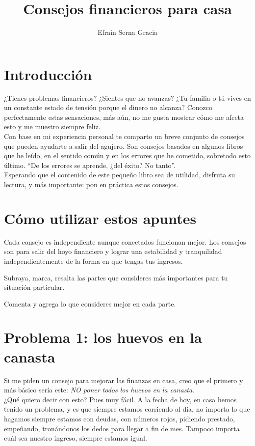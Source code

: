 \documentclass[12pt]{book} %
\title{Consejos financieros para casa}
\author{Efraín Serna Gracia}
\begin{document}
\maketitle
\tableofcontents
\chapter{Introducción}
¿Tienes problemas financieros? ¿Sientes que no avanzas? ¿Tu familia o tú vives en un constante estado de tensión porque el dinero no alcanza? Conozco perfectamente estas sensaciones, más aún, no me gusta mostrar cómo me afecta esto y me muestro siempre feliz.\\

Con base en mi experiencia personal te comparto un breve conjunto de consejos que pueden ayudarte a salir del agujero. Son consejos basados en algunos libros que he leído, en el sentido común y en los errores que he cometido, sobretodo esto último. ``De los errores se aprende, ¿del éxito? No tanto''.\\

Esperando que el contenido de este pequeño libro sea de utilidad, disfruta su lectura, y más importante: pon en práctica estos consejos.

\chapter{Cómo utilizar estos apuntes}
Cada consejo es independiente aunque conectados funcionan mejor. Los consejos son para salir del hoyo financiero y lograr una estabilidad y tranquilidad independientemente de la forma en que tengas tus ingresos.

Subraya, marca, resalta las partes que consideres más importantes para tu situación particular.

Comenta y agrega lo que consideres mejor en cada parte.

\chapter[Los huevos en la canasta]{Problema 1: los huevos en la canasta}
Si me piden un consejo para mejorar las finanzas en casa, creo que el primero y más básico sería este: \emph{NO poner todos los huevos en la canasta}.\\

¿Qué quiero decir con esto? Pues muy fácil. A la fecha de hoy, en casa hemos tenido un problema, y es que siempre estamos corriendo al día, no importa lo que hagamos siempre estamos con deudas, con números rojos, pidiendo prestado, empeñando, tronándonos los dedos para llegar a fin de mes. Tampoco importa cuál sea nuestro ingreso, siempre estamos igual.\\
\end{document}
